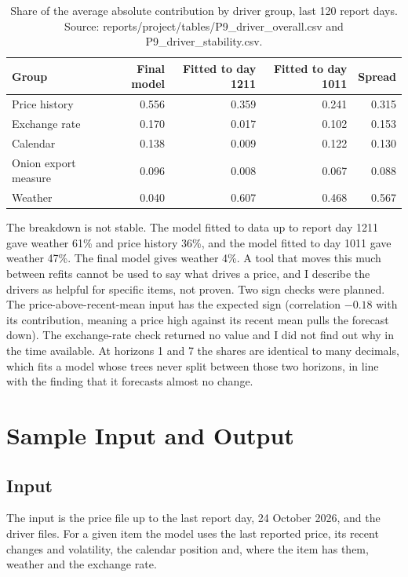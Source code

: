 \documentclass[12pt]{report}
\begin{document}
\begin{table}[H]\centering\small
\caption{Share of the average absolute contribution by driver group, last 120 report days. Source: reports/project/tables/P9\_driver\_overall.csv and P9\_driver\_stability.csv.}\label{tab:drivers}
\begin{tabular}{|l|r|r|r|r|}
\hline
\textbf{Group} & \textbf{Final model} & \textbf{Fitted to day 1211} & \textbf{Fitted to day 1011} & \textbf{Spread} \\
\hline
Price history & 0.556 & 0.359 & 0.241 & 0.315 \\
\hline
Exchange rate & 0.170 & 0.017 & 0.102 & 0.153 \\
\hline
Calendar & 0.138 & 0.009 & 0.122 & 0.130 \\
\hline
Onion export measure & 0.096 & 0.008 & 0.067 & 0.088 \\
\hline
Weather & 0.040 & 0.607 & 0.468 & 0.567 \\
\hline
\end{tabular}
\end{table}

The breakdown is not stable. The model fitted to data up to report day 1211 gave weather 61\% and price history 36\%, and the model fitted to day 1011 gave weather 47\%. The final model gives weather 4\%. A tool that moves this much between refits cannot be used to say what drives a price, and I describe the drivers as helpful for specific items, not proven. Two sign checks were planned. The price-above-recent-mean input has the expected sign (correlation $-0.18$ with its contribution, meaning a price high against its recent mean pulls the forecast down). The exchange-rate check returned no value and I did not find out why in the time available. At horizons 1 and 7 the shares are identical to many decimals, which fits a model whose trees never split between those two horizons, in line with the finding that it forecasts almost no change.

\section{Sample Input and Output}

\subsection{Input}
The input is the price file up to the last report day, 24 October 2026, and the driver files. For a given item the model uses the last reported price, its recent changes and volatility, the calendar position and, where the item has them, weather and the exchange rate.
\end{document}
